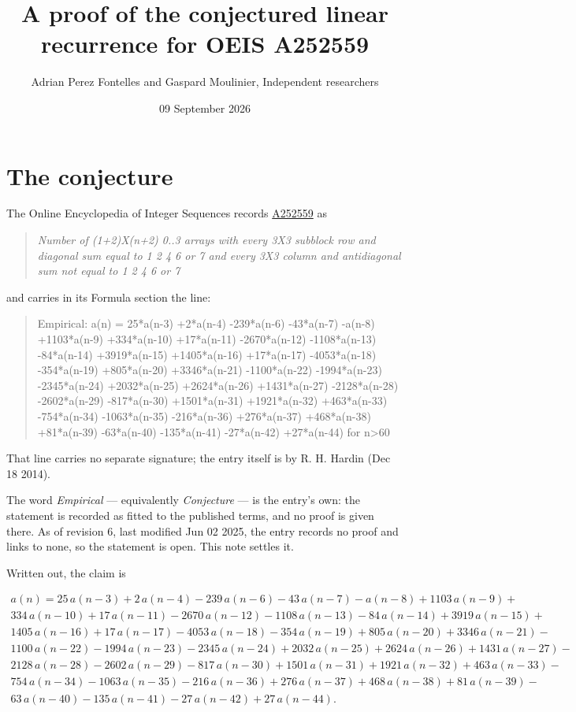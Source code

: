 \documentclass[11pt]{article}
\title{A proof of the conjectured linear recurrence for OEIS A252559}
\author{Adrian Perez Fontelles and Gaspard Moulinier, Independent researchers}
\date{09 September 2026}
\theoremstyle{definition}
\begin{document}
\maketitle
\section{The conjecture}

The Online Encyclopedia of Integer Sequences records \href{https://oeis.org/A252559}{A252559} as

\begin{quote}\itshape Number of (1+2)X(n+2) 0..3 arrays with every 3X3 subblock row and diagonal sum equal to 1 2 4 6 or 7 and every 3X3 column and antidiagonal sum not equal to 1 2 4 6 or 7\end{quote}

and carries in its Formula section the line:

\begin{quote}\ttfamily Empirical: a(n) = 25*a(n-3) +2*a(n-4) -239*a(n-6) -43*a(n-7) -a(n-8) +1103*a(n-9) +334*a(n-10) +17*a(n-11) -2670*a(n-12) -1108*a(n-13) -84*a(n-14) +3919*a(n-15) +1405*a(n-16) +17*a(n-17) -4053*a(n-18) -354*a(n-19) +805*a(n-20) +3346*a(n-21) -1100*a(n-22) -1994*a(n-23) -2345*a(n-24) +2032*a(n-25) +2624*a(n-26) +1431*a(n-27) -2128*a(n-28) -2602*a(n-29) -817*a(n-30) +1501*a(n-31) +1921*a(n-32) +463*a(n-33) -754*a(n-34) -1063*a(n-35) -216*a(n-36) +276*a(n-37) +468*a(n-38) +81*a(n-39) -63*a(n-40) -135*a(n-41) -27*a(n-42) +27*a(n-44) for n>60\end{quote}

That line carries no separate signature; the entry itself is by R. H. Hardin (Dec 18 2014).

The word {\itshape Empirical} --- equivalently {\itshape Conjecture} --- is the entry's own: the statement is recorded as fitted to the published terms, and no proof is given there. As of revision 6, last modified Jun 02 2025, the entry records no proof and links to none, so the statement is open. This note settles it.

Written out, the claim is

\begin{multline*} a(n) = 25\,a(n-3) + 2\,a(n-4) - 239\,a(n-6) - 43\,a(n-7) - a(n-8) + 1103\,a(n-9) + \\ 334\,a(n-10) + 17\,a(n-11) - 2670\,a(n-12) - 1108\,a(n-13) - 84\,a(n-14) + 3919\,a(n-15) + \\ 1405\,a(n-16) + 17\,a(n-17) - 4053\,a(n-18) - 354\,a(n-19) + 805\,a(n-20) + 3346\,a(n-21) - \\ 1100\,a(n-22) - 1994\,a(n-23) - 2345\,a(n-24) + 2032\,a(n-25) + 2624\,a(n-26) + 1431\,a(n-27) - \\ 2128\,a(n-28) - 2602\,a(n-29) - 817\,a(n-30) + 1501\,a(n-31) + 1921\,a(n-32) + 463\,a(n-33) - \\ 754\,a(n-34) - 1063\,a(n-35) - 216\,a(n-36) + 276\,a(n-37) + 468\,a(n-38) + 81\,a(n-39) - \\ 63\,a(n-40) - 135\,a(n-41) - 27\,a(n-42) + 27\,a(n-44). \end{multline*}
\end{document}
